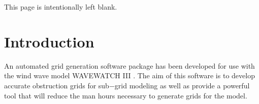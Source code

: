 \documentclass[12pt]{article}
\newcommand{\pstyle}{plain}
\newcommand{\pb}{\strut \vfill \pagebreak}
\newcommand{\bpagea}{\strut

\vspace{2.5in} \centerline{This page is intentionally left blank.}}
\newcommand{\newsec}{\setcounter{equation}{0}
                     \setcounter{myfigno}{0}
                     \setcounter{mytabno}{0}}
\newcounter{myfigno}[section]
\newcounter{mytabno}[section]
\begin{document}
\vfill \pagebreak

\tableofcontents

\pb
\pagestyle{empty}

\bpagea


\pb
\pagestyle{\pstyle}
\section{Introduction} \label{sec:intro}
\newsec

\noindent

An automated grid generation software package has been developed for use with the wind wave model WAVEWATCH III \cite[]{tolman-02}. The aim of this software is to develop accurate obstruction grids for sub$-$grid modeling \cite[]{tol2003} as well as provide a powerful tool that will reduce the man hours necessary to generate grids for the model.  
\end{document}
